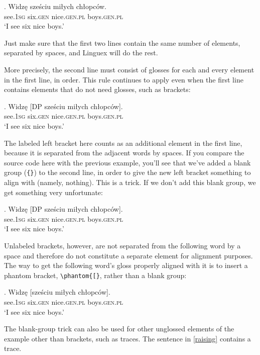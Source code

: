 \documentclass[letterpaper,12pt, twoside]{article}
\begin{document}
\exg. Widz\k{e}  sze\'sciu {mi\l ych} {ch\l opc\'ow}. \\ 
see.\textsc{1sg} six.\textsc{gen} nice.\textsc{gen.pl} boys.\textsc{gen.pl} \\ 
 `I see six nice boys.'

Just make sure that the first two lines contain the same number of elements, separated by spaces, and {Linguex} will do the rest. 

More precisely, the second line must consist of glosses for each and every element in the first line, in order. This rule continues to apply even when the first line contains elements that do not need glosses, such as brackets:

\exig. Widz\k{e}  [DP sze\'sciu {mi\l ych} {ch\l opc\'ow}]. \\ 
see.\textsc{1sg} {} six.\textsc{gen} nice.\textsc{gen.pl} boys.\textsc{gen.pl} \\ 
 `I see six nice boys.' 

The labeled left bracket here counts as an additional element in the first line, because it is separated from the adjacent words by spaces. If you compare the source code here with the previous example, you'll see that we've added a blank group (\verb|{}|) to the second line, in order to give the new left bracket something to align with (namely, nothing). This is a trick. If we don't add this blank group, we get something very unfortunate:

\exig. Widz\k{e}  [DP sze\'sciu {mi\l ych} {ch\l opc\'ow}]. \\ 
see.\textsc{1sg} six.\textsc{gen} nice.\textsc{gen.pl} boys.\textsc{gen.pl} \\
 `I see six nice boys.' 

Unlabeled brackets, however, are not separated from the following word by a space and therefore  do not constitute a separate element for alignment purposes. The way to get the following word's gloss  properly aligned with it is to insert a phantom bracket, \verb|\phantom{[}|, rather than a blank group:

\exg. 
Widz\k{e}  [sze\'sciu {mi\l ych} {ch\l opc\'ow}]. \\ 
see.\textsc{1sg} \phantom{[}six.\textsc{gen} nice.\textsc{gen.pl} boys.\textsc{gen.pl} \\ 
 `I see six nice boys.' 


The blank-group trick can also be used for other unglossed elements of the example other than brackets, such as traces. The sentence in \ref{raising} contains a trace.
\end{document}

